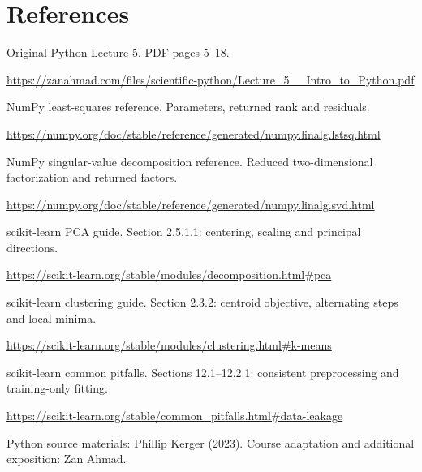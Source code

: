 \documentclass[11pt,letterpaper]{article}
\theoremstyle{definition}\newtheorem{definition}{Definition}\newtheorem{example}{Example}
\numberwithin{equation}{section}
\begin{document}
\section*{References}
\noindent\begin{minipage}{\linewidth}
Original Python Lecture 5. PDF pages 5--18.

\url{https://zanahmad.com/files/scientific-python/Lecture_5__Intro_to_Python.pdf}
\end{minipage}\par\medskip
\noindent\begin{minipage}{\linewidth}
NumPy least-squares reference. Parameters, returned rank and residuals.

\url{https://numpy.org/doc/stable/reference/generated/numpy.linalg.lstsq.html}
\end{minipage}\par\medskip
\noindent\begin{minipage}{\linewidth}
NumPy singular-value decomposition reference. Reduced two-dimensional factorization and returned factors.

\url{https://numpy.org/doc/stable/reference/generated/numpy.linalg.svd.html}
\end{minipage}\par\medskip
\noindent\begin{minipage}{\linewidth}
scikit-learn PCA guide. Section 2.5.1.1: centering, scaling and principal directions.

\url{https://scikit-learn.org/stable/modules/decomposition.html#pca}
\end{minipage}\par\medskip
\noindent\begin{minipage}{\linewidth}
scikit-learn clustering guide. Section 2.3.2: centroid objective, alternating steps and local minima.

\url{https://scikit-learn.org/stable/modules/clustering.html#k-means}
\end{minipage}\par\medskip
\noindent\begin{minipage}{\linewidth}
scikit-learn common pitfalls. Sections 12.1--12.2.1: consistent preprocessing and training-only fitting.

\url{https://scikit-learn.org/stable/common_pitfalls.html#data-leakage}
\end{minipage}\par\medskip
Python source materials: Phillip Kerger (2023). Course adaptation and additional exposition: Zan Ahmad.
\end{document}
